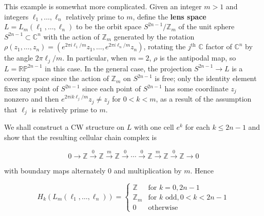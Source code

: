 \begin{example}
\label{ex:lens-spaces}
This example is somewhat more complicated. Given an integer $m > 1$ and integers $\ell_1, \ldots, \ell_n$ relatively prime to $m$, define the \textbf{lens space} $L = L_m(\ell_1, \ldots, \ell_n)$ to be the orbit space $S^{2n-1}/\mathbb{Z}_m$ of the unit sphere $S^{2n-1} \subset \mathbb{C}^n$ with the action of $\mathbb{Z}_m$ generated by the rotation $\rho(z_1, \ldots, z_n) = (e^{2\pi i\ell_1/m} z_1, \ldots, e^{2\pi i\ell_n/m} z_n)$, rotating the $j^{\text{th}}$ $\mathbb{C}$ factor of $\mathbb{C}^n$ by the angle $2\pi \ell_j/m$. In particular, when $m = 2$, $\rho$ is the antipodal map, so $L = \mathbb{RP}^{2n-1}$ in this case. In the general case, the projection $S^{2n-1} \to L$ is a covering space since the action of $\mathbb{Z}_m$ on $S^{2n-1}$ is free; only the identity element fixes any point of $S^{2n-1}$ since each point of $S^{2n-1}$ has some coordinate $z_j$ nonzero and then $e^{2\pi ik\ell_j/m} z_j \ne z_j$ for $0 < k < m$, as a result of the assumption that $\ell_j$ is relatively prime to $m$.
\end{example}

We shall construct a CW structure on $L$ with one cell $e^k$ for each $k \le 2n - 1$ and show that the resulting cellular chain complex is

\[
0 \to \mathbb{Z} \xrightarrow{0} \mathbb{Z} \xrightarrow{m} \mathbb{Z} \xrightarrow{0} \cdots \xrightarrow{0} \mathbb{Z} \xrightarrow{m} \mathbb{Z} \xrightarrow{0} \mathbb{Z} \to 0
\]

with boundary maps alternately 0 and multiplication by $m$. Hence

\[
H_k(L_m(\ell_1, \ldots, \ell_n)) = \begin{cases}
\mathbb{Z} & \text{for } k = 0, 2n - 1 \\
\mathbb{Z}_m & \text{for } k \text{ odd}, 0 < k < 2n - 1 \\
0 & \text{otherwise}
\end{cases}
\]

